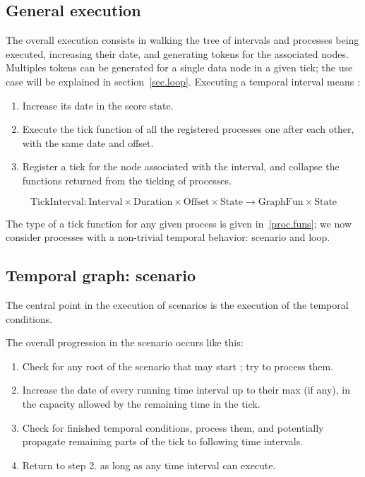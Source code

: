 \documentclass[applsci,article,submit,moreauthors,pdftex,10pt,a4paper]{mdpi}
\begin{document}
\subsection{General execution}
The overall execution consists in walking the tree of intervals and processes being executed, increasing their date, and generating tokens for the associated nodes.
Multiples tokens can be generated for a single data node in a given tick; the use case will be explained in section~\ref{sec.loop}.
Executing a temporal interval means : 

\begin{enumerate}
\item Increase its date in the score state. 
\item Execute the tick function of all the registered processes one after each other, with the same date and offset.
\item Register a tick for the node associated with the interval, and collapse the functions returned from the ticking of processes.
\end{enumerate}
\[
\mathrm{TickInterval}: \mathrm{Interval} \times \mathrm{Duration} \times \mathrm{Offset} \times \mathrm{State} \rightarrow \mathrm{GraphFun} \times \mathrm{State}
\]

The type of a tick function for any given process is given in~\ref{proc.funs}; we now consider processes with a non-trivial temporal behavior: scenario and loop.

\subsection{Temporal graph: scenario}\label{sec.scenario}
The central point in the execution of scenarios is the execution of the temporal conditions. 

The overall progression in the scenario occurs like this: 

\begin{enumerate}
\item Check for any root of the scenario that may start ; try to process them.
\item Increase the date of every running time interval up to their max (if any), in the capacity allowed by the remaining time in the tick.
\item Check for finished temporal conditions, process them, and potentially propagate remaining parts of the tick to following time intervals.
\item Return to step 2. as long as any time interval can execute.
\end{enumerate}
\end{document}
